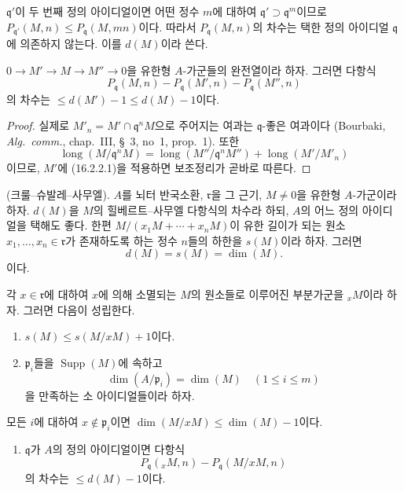 $\mathfrak{q}'$이 두 번째 정의 아이디얼이면 어떤 정수 $m$에 대하여
$\mathfrak{q}'\supset\mathfrak{q}^m$이므로
$P_{\mathfrak{q}'}(M,n)\leq P_{\mathfrak{q}}(M,mn)$이다. 따라서
$P_{\mathfrak{q}}(M,n)$의 차수는 택한 정의 아이디얼
$\mathfrak{q}$에 의존하지 않는다. 이를 $d(M)$이라 쓴다.

\begin{lemma}[16.2.2.2]
\label{0.16.2.2.2-fr}
$0\to M'\to M\to M''\to0$을 유한형 $A$-가군들의 완전열이라 하자.
그러면 다항식
\[
  P_{\mathfrak{q}}(M,n)-P_{\mathfrak{q}}(M',n)
  -P_{\mathfrak{q}}(M'',n)
\]
의 차수는 $\leq d(M')-1\leq d(M)-1$이다.
\end{lemma}

\begin{proof}
실제로 $M'_n=M'\cap\mathfrak{q}^nM$으로 주어지는 여과는
$\mathfrak{q}$-좋은 여과이다 (Bourbaki, \emph{Alg.~comm.},
chap.~III, \S~3, no~1, prop.~1). 또한
\[
  \operatorname{long}(M/\mathfrak{q}^nM)
  =\operatorname{long}(M''/\mathfrak{q}^nM'')
  +\operatorname{long}(M'/M'_n)
\]
이므로, $M'$에 (16.2.2.1)을 적용하면 보조정리가 곧바로 따른다.
\end{proof}

\begin{theorem}[16.2.3]
\label{0.16.2.3-fr}
\textup{(크룰--슈발레--사무엘).}
$A$를 뇌터 반국소환, $\mathfrak{r}$을 그 근기, $M\neq0$을 유한형
$A$-가군이라 하자. $d(M)$을 $M$의 힐베르트--사무엘 다항식의
차수라 하되, $A$의 어느 정의 아이디얼을 택해도 좋다. 한편
$M/(x_1M+\cdots+x_nM)$이 유한 길이가 되는 원소
$x_1,\ldots,x_n\in\mathfrak{r}$가 존재하도록 하는 정수 $n$들의
하한을 $s(M)$이라 하자. 그러면
\[
  d(M)=s(M)=\dim(M).
\]
이다.
\end{theorem}

\begin{lemma}[16.2.3.1]
\label{0.16.2.3.1-fr}
각 $x\in\mathfrak{r}$에 대하여 $x$에 의해 소멸되는 $M$의 원소들로
이루어진 부분가군을 ${}_xM$이라 하자. 그러면 다음이 성립한다.
\begin{enumerate}
  \item[\rm{(i)}] $s(M)\leq s(M/xM)+1$이다.
  \item[\rm{(ii)}] $\mathfrak{p}_i$들을
  $\operatorname{Supp}(M)$에 속하고
  \[
    \dim(A/\mathfrak{p}_i)=\dim(M)\quad(1\leq i\leq m)
  \]
  을 만족하는 소 아이디얼들이라 하자.
\end{enumerate}
모든 $i$에 대하여 $x\notin\mathfrak{p}_i$이면
$\dim(M/xM)\leq\dim(M)-1$이다.
\begin{enumerate}
  \item[\rm{(iii)}] $\mathfrak{q}$가 $A$의 정의 아이디얼이면 다항식
  \[
    P_{\mathfrak{q}}({}_xM,n)-P_{\mathfrak{q}}(M/xM,n)
  \]
  의 차수는 $\leq d(M)-1$이다.
\end{enumerate}
\end{lemma}

